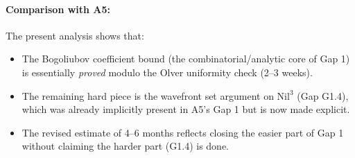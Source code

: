 \documentclass[11pt, a4paper]{article}
\newcommand{\Nil}{\mathrm{Nil}^3}
\begin{document}
\paragraph{Comparison with A5:}
The present analysis shows that:
\begin{itemize}
\item The Bogoliubov coefficient bound (the combinatorial/analytic core of Gap 1)
  is essentially \emph{proved} modulo the Olver uniformity check (2--3 weeks).
\item The remaining hard piece is the wavefront set argument on $\Nil$
  (Gap G1.4), which was already implicitly present in A5's Gap 1
  but is now made explicit.
\item The revised estimate of 4--6 months reflects closing the easier part
  of Gap 1 without claiming the harder part (G1.4) is done.
\end{itemize}
\end{document}
